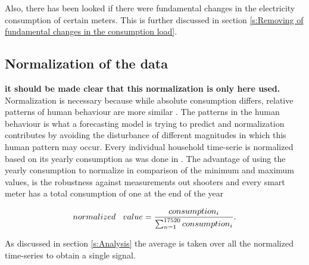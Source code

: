

Also, there has been looked if there were fundamental changes in the electricity consumption of certain meters. This is further discussed in section \ref{s:Removing of fundamental changes in the consumption load}.


\subsection{Normalization of the data}
\label{s:Normalization of the data}
\textbf{it should be made clear that this normalization is only here used.}
Normalization is necessary because while absolute consumption differs, relative patterns of human behaviour are more similar \cite{Lago2020}. The patterns in the human behaviour is what a forecasting model is trying to predict and normalization contributes by avoiding the disturbance of different magnitudes in which this human pattern may occur. Every individual household time-serie is normalized based on its yearly consumption as was done in \cite{Lago2020}. The advantage of using the yearly consumption to normalize in comparison of the minimum and maximum values, is the robustness against measurements out shooters and every smart meter has a total consumption of one at the end of the year

\begin{equation}\label{eq:norm}
	normalized\hspace{0.3cm} value = \frac{consumption_i}{\sum_{n=1}^{17520} consumption_i}.
\end{equation} 

As discussed in section \ref{s:Analysis} the average is taken over all the normalized time-series to obtain a single signal.  


